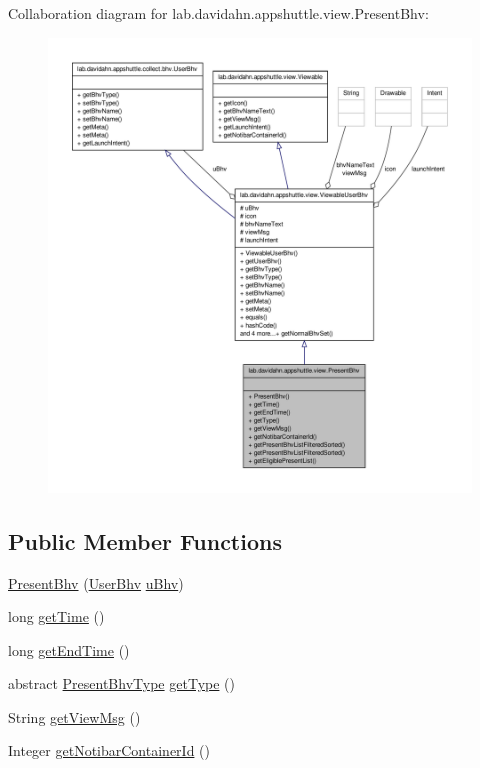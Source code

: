 \-Collaboration diagram for lab.\-davidahn.\-appshuttle.\-view.\-Present\-Bhv\-:
\nopagebreak
\begin{figure}[H]
\begin{center}
\leavevmode
\includegraphics[width=350pt]{classlab_1_1davidahn_1_1appshuttle_1_1view_1_1_present_bhv__coll__graph}
\end{center}
\end{figure}
\subsection*{\-Public \-Member \-Functions}
\begin{DoxyCompactItemize}
\item 
\hyperlink{classlab_1_1davidahn_1_1appshuttle_1_1view_1_1_present_bhv_ace9b423fe65d63f8a89be469ecdaff65}{\-Present\-Bhv} (\hyperlink{interfacelab_1_1davidahn_1_1appshuttle_1_1collect_1_1bhv_1_1_user_bhv}{\-User\-Bhv} \hyperlink{classlab_1_1davidahn_1_1appshuttle_1_1view_1_1_viewable_user_bhv_a562684126a3e756e8ebe246c89699ba9}{u\-Bhv})
\item 
long \hyperlink{classlab_1_1davidahn_1_1appshuttle_1_1view_1_1_present_bhv_a76bddbf589b02807d118229af32e1d4c}{get\-Time} ()
\item 
long \hyperlink{classlab_1_1davidahn_1_1appshuttle_1_1view_1_1_present_bhv_a64bd675e90c0b8ccd93085518a789948}{get\-End\-Time} ()
\item 
abstract \hyperlink{enumlab_1_1davidahn_1_1appshuttle_1_1view_1_1_present_bhv_type}{\-Present\-Bhv\-Type} \hyperlink{classlab_1_1davidahn_1_1appshuttle_1_1view_1_1_present_bhv_ac0e40ea3b6d9e7f048815ac850edc9c7}{get\-Type} ()
\item 
\-String \hyperlink{classlab_1_1davidahn_1_1appshuttle_1_1view_1_1_present_bhv_a724bfd36fbd0b4b361f8e0591a7c68fe}{get\-View\-Msg} ()
\item 
\-Integer \hyperlink{classlab_1_1davidahn_1_1appshuttle_1_1view_1_1_present_bhv_a9e1ce777852185a8dee49270179a3e4f}{get\-Notibar\-Container\-Id} ()
\end{DoxyCompactItemize}
